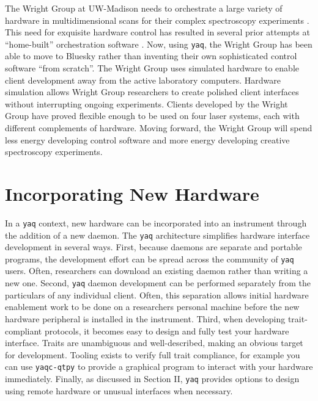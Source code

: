\documentclass[aip, amsmath, amssymb, reprint,]{revtex4-2}
\newcommand\yaq{\texttt{yaq}}
\begin{document}
The Wright Group at UW-Madison needs to orchestrate a large variety of hardware in multidimensional scans for their complex spectroscopy experiments \cite{MukamelShaul2000a, WrightJohnCurtis2011a}.
This need for exquisite hardware control has resulted in several prior attempts at ``home-built'' orchestration software \cite{CarlsonRogerJohn1988a, MeyerKentAlbert2004b, KainSchuyler2017a, ThompsonBlaiseJonathan2018a, SundenKyle2022}.
Now, using \yaq{}, the Wright Group has been able to move to Bluesky rather than inventing their own sophisticated control software ``from scratch''.
The Wright Group uses simulated hardware to enable client development away from the active laboratory computers.
Hardware simulation allows Wright Group researchers to create polished client interfaces without interrupting  ongoing experiments.
Clients developed by the Wright Group have proved flexible enough to be used on four laser systems, each with different complements of hardware.
Moving forward, the Wright Group will spend less energy developing control software and more energy developing creative spectroscopy experiments.

\section{Incorporating New Hardware}

In a \yaq{} context, new hardware can be incorporated into an instrument through the addition of a new daemon.
The \yaq{} architecture simplifies hardware interface development in several ways.
First, because daemons are separate and portable programs, the development effort can be spread across the community of \yaq{} users.
Often, researchers can download an existing daemon rather than writing a new one.
Second, \yaq{} daemon development can be performed separately from the particulars of any individual client.
Often, this separation allows initial hardware enablement work to be done on a researchers personal machine before the new hardware peripheral is installed in the instrument.
Third, when developing trait-compliant protocols, it becomes easy to design and fully test your hardware interface.
Traits are unambiguous and well-described, making an obvious target for development.
Tooling exists to verify full trait compliance, for example you can use \texttt{yaqc-qtpy} to provide a graphical program to interact with your hardware immediately.
Finally, as discussed in Section II, \yaq{} provides options to design using remote hardware or unusual interfaces when necessary.
\end{document}
